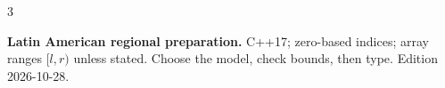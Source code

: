 \documentclass[9pt,a4paper,notitlepage]{extreport}
\begin{document}
\begin{multicols*}{3}
\raggedcolumns
{}\par
\textbf{Latin American regional preparation.} C++17; zero-based indices;
array ranges $[l,r)$ unless stated. Choose the model, check bounds, then type.
Edition 2026-10-28.\par
\tableofcontents
\thispagestyle{fancy}
\end{multicols*}
\end{document}
